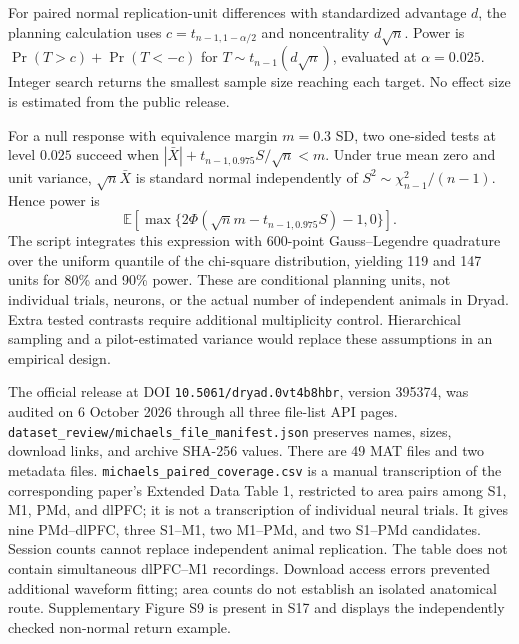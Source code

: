 \documentclass[11pt,a4paper]{article}
\begin{document}
For paired normal replication-unit differences with standardized advantage $d$, the planning calculation uses $c=t_{n-1,1-\alpha/2}$ and noncentrality $d\sqrt n$. Power is $\Pr(T>c)+\Pr(T<-c)$ for $T\sim t_{n-1}(d\sqrt n)$, evaluated at $\alpha=0.025$. Integer search returns the smallest sample size reaching each target. No effect size is estimated from the public release.

For a null response with equivalence margin $m=0.3$ SD, two one-sided tests at level $0.025$ succeed when $|\bar X|+t_{n-1,0.975}S/\sqrt n<m$. Under true mean zero and unit variance, $\sqrt n\bar X$ is standard normal independently of $S^2\sim\chi^2_{n-1}/(n-1)$. Hence power is
\[
\mathbb E\left[\max\{2\Phi(\sqrt n m-t_{n-1,0.975}S)-1,0\}\right].
\]
The script integrates this expression with 600-point Gauss--Legendre quadrature over the uniform quantile of the chi-square distribution, yielding 119 and 147 units for 80\% and 90\% power. These are conditional planning units, not individual trials, neurons, or the actual number of independent animals in Dryad. Extra tested contrasts require additional multiplicity control. Hierarchical sampling and a pilot-estimated variance would replace these assumptions in an empirical design.

The official release at DOI \texttt{10.5061/dryad.0vt4b8hbr}, version 395374, was audited on 6 October 2026 through all three file-list API pages. \texttt{dataset\_review/michaels\_file\_manifest.json} preserves names, sizes, download links, and archive SHA-256 values. There are 49 MAT files and two metadata files. \texttt{michaels\_paired\_coverage.csv} is a manual transcription of the corresponding paper's Extended Data Table 1, restricted to area pairs among S1, M1, PMd, and dlPFC; it is not a transcription of individual neural trials. It gives nine PMd--dlPFC, three S1--M1, two M1--PMd, and two S1--PMd candidates. Session counts cannot replace independent animal replication. The table does not contain simultaneous dlPFC--M1 recordings. Download access errors prevented additional waveform fitting; area counts do not establish an isolated anatomical route. Supplementary Figure S9 is present in S17 and displays the independently checked non-normal return example.
\end{document}

